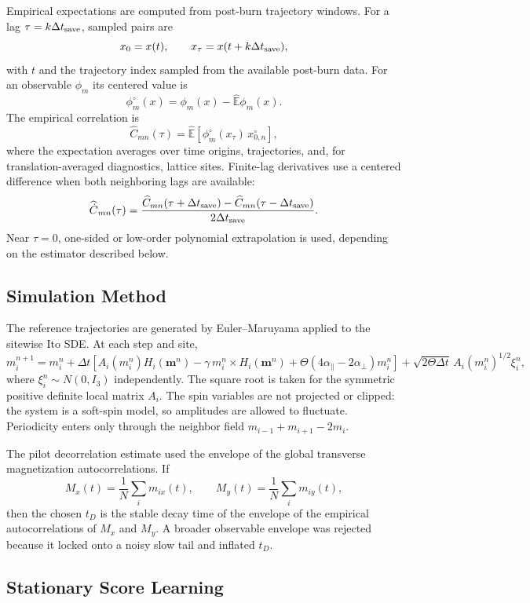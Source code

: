 \documentclass[11pt]{article}
\newcommand{\E}{\mathbb{E}}
\begin{document}
Empirical expectations are computed from post-burn trajectory windows.  For a
lag $\tau=k\Delta t_{\rm save}$, sampled pairs are
\[
  x_0=x(t),\qquad x_\tau=x(t+k\Delta t_{\rm save}),
\]
with $t$ and the trajectory index sampled from the available post-burn data.
For an observable $\phi_m$ its centered value is
\[
  \phi_m^\circ(x)=\phi_m(x)-\widehat{\E}\phi_m(x).
\]
The empirical correlation is
\[
  \widehat C_{mn}(\tau)
  =
  \widehat{\E}\!\left[\phi_m^\circ(x_\tau)\,x_{0,n}^\circ\right],
\]
where the expectation averages over time origins, trajectories, and, for
translation-averaged diagnostics, lattice sites.  Finite-lag derivatives use a
centered difference when both neighboring lags are available:
\[
  \widehat{\dot C}_{mn}(\tau)
  =
  \frac{
    \widehat C_{mn}(\tau+\Delta t_{\rm save})
    -
    \widehat C_{mn}(\tau-\Delta t_{\rm save})
  }{2\Delta t_{\rm save}} .
\]
Near $\tau=0$, one-sided or low-order polynomial extrapolation is used,
depending on the estimator described below.

\subsection{Simulation Method}

The reference trajectories are generated by Euler--Maruyama applied to the
sitewise Ito SDE.  At each step and site,
\[
  m_i^{n+1}
  =
  m_i^n
  +
  \Delta t
  \left[
    A_i(m_i^n)H_i(\bm m^n)
    -\gamma\,m_i^n\times H_i(\bm m^n)
    +\Theta(4\alpha_\parallel-2\alpha_\perp)m_i^n
  \right]
  +
  \sqrt{2\Theta\Delta t}\,A_i(m_i^n)^{1/2}\xi_i^n ,
\]
where $\xi_i^n\sim N(0,I_3)$ independently.  The square root is taken for the
symmetric positive definite local matrix $A_i$.  The spin variables are not
projected or clipped: the system is a soft-spin model, so amplitudes are allowed
to fluctuate.  Periodicity enters only through the neighbor field
$m_{i-1}+m_{i+1}-2m_i$.

The pilot decorrelation estimate used the envelope of the global transverse
magnetization autocorrelations.  If
\[
  M_x(t)=\frac1N\sum_i m_{ix}(t),\qquad
  M_y(t)=\frac1N\sum_i m_{iy}(t),
\]
then the chosen $t_D$ is the stable decay time of the envelope of the empirical
autocorrelations of $M_x$ and $M_y$.  A broader observable envelope was rejected
because it locked onto a noisy slow tail and inflated $t_D$.

\subsection{Stationary Score Learning}
\end{document}
